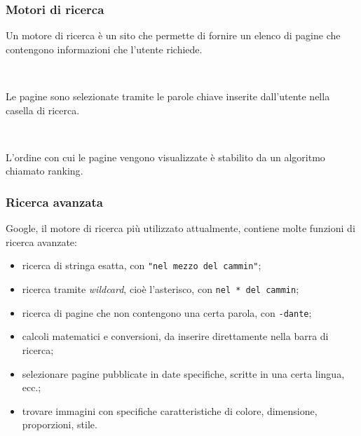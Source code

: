 \documentclass[]{beamer}
\begin{document}
\begin{frame}
\frametitle{Motori di ricerca}
Un motore di ricerca è un sito che permette di fornire un \alert<1>{elenco di pagine} che contengono informazioni che l'utente richiede.\pause

~

Le pagine sono selezionate tramite le \alert<2>{parole chiave} inserite dall'utente nella \alert<2>{casella di ricerca}.\pause

~

L'ordine con cui le pagine vengono visualizzate è stabilito da un algoritmo chiamato \alert<3>{ranking}.
\end{frame}



\begin{frame}
\frametitle{Ricerca avanzata}
Google, il motore di ricerca più utilizzato attualmente, contiene molte funzioni di ricerca avanzate:\pause
\begin{itemize}
  \item ricerca di stringa esatta, con \texttt{"nel mezzo del cammin"};\pause
  \item ricerca tramite \emph{wildcard}, cioè l'asterisco, con \texttt{nel * del cammin};\pause
  \item ricerca di pagine che non contengono una certa parola, con \texttt{-dante};\pause
  \item calcoli matematici e conversioni, da inserire direttamente nella barra di ricerca;\pause
  \item selezionare pagine pubblicate in date specifiche, scritte in una certa lingua, ecc.;\pause
  \item trovare immagini con specifiche caratteristiche di colore, dimensione, proporzioni, stile. 
\end{itemize}
\end{frame}
\end{document}
